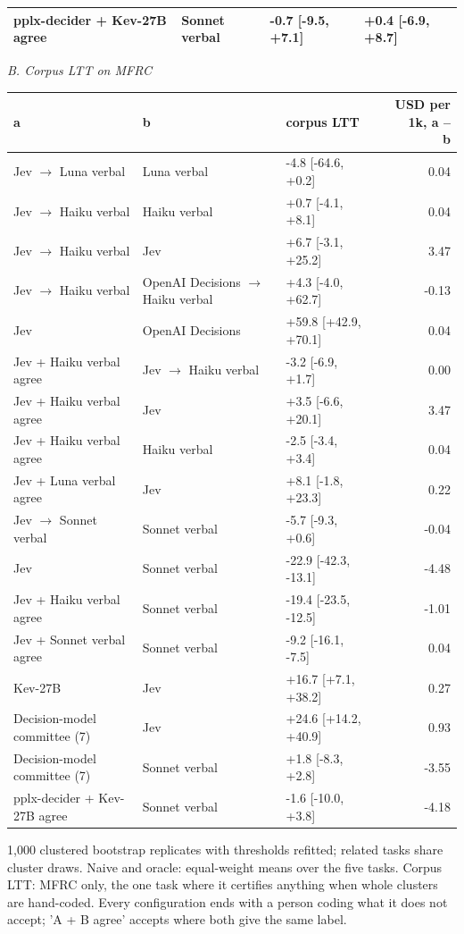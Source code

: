 \begin{table}[t]
\begin{adjustbox}{max width=\linewidth}
\begin{tabular}{llll}
pplx-decider + Kev-27B agree & Sonnet verbal & -0.7 [-9.5, +7.1] & +0.4 [-6.9, +8.7] \\
\bottomrule
\end{tabular}
\end{adjustbox}
\medskip
\par\textit{B. Corpus LTT on MFRC}\par\smallskip
\begin{adjustbox}{max width=\linewidth}
\begin{tabular}{lllr}
\toprule
a & b & corpus LTT & \makecell[br]{USD per 1k, a -- \\{} b} \\
\midrule
Jev $\rightarrow$ Luna verbal & Luna verbal & -4.8 [-64.6, +0.2] & 0.04 \\
Jev $\rightarrow$ Haiku verbal & Haiku verbal & +0.7 [-4.1, +8.1] & 0.04 \\
Jev $\rightarrow$ Haiku verbal & Jev & +6.7 [-3.1, +25.2] & 3.47 \\
Jev $\rightarrow$ Haiku verbal & OpenAI Decisions $\rightarrow$ Haiku verbal & +4.3 [-4.0, +62.7] & -0.13 \\
Jev & OpenAI Decisions & +59.8 [+42.9, +70.1] & 0.04 \\
Jev + Haiku verbal agree & Jev $\rightarrow$ Haiku verbal & -3.2 [-6.9, +1.7] & 0.00 \\
Jev + Haiku verbal agree & Jev & +3.5 [-6.6, +20.1] & 3.47 \\
Jev + Haiku verbal agree & Haiku verbal & -2.5 [-3.4, +3.4] & 0.04 \\
Jev + Luna verbal agree & Jev & +8.1 [-1.8, +23.3] & 0.22 \\
Jev $\rightarrow$ Sonnet verbal & Sonnet verbal & -5.7 [-9.3, +0.6] & -0.04 \\
Jev & Sonnet verbal & -22.9 [-42.3, -13.1] & -4.48 \\
Jev + Haiku verbal agree & Sonnet verbal & -19.4 [-23.5, -12.5] & -1.01 \\
Jev + Sonnet verbal agree & Sonnet verbal & -9.2 [-16.1, -7.5] & 0.04 \\
Kev-27B & Jev & +16.7 [+7.1, +38.2] & 0.27 \\
Decision-model committee (7) & Jev & +24.6 [+14.2, +40.9] & 0.93 \\
Decision-model committee (7) & Sonnet verbal & +1.8 [-8.3, +2.8] & -3.55 \\
pplx-decider + Kev-27B agree & Sonnet verbal & -1.6 [-10.0, +3.8] & -4.18 \\
\bottomrule
\end{tabular}
\end{adjustbox}
\par\smallskip\footnotesize\raggedright 1,000 clustered bootstrap replicates with thresholds refitted; related tasks share cluster draws. Naive and oracle: equal-weight means over the five tasks. Corpus LTT: MFRC only, the one task where it certifies anything when whole clusters are hand-coded. Every configuration ends with a person coding what it does not accept; 'A + B agree' accepts where both give the same label.
\end{table}

